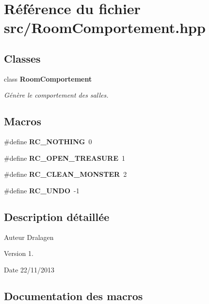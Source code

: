 \section{Référence du fichier src/\-Room\-Comportement.hpp}
\label{_room_comportement_8hpp}
\subsection*{Classes}
\begin{DoxyCompactItemize}
\item 
class {\bf Room\-Comportement}
\begin{DoxyCompactList}\small\item\em Génère le comportement des salles. \end{DoxyCompactList}\end{DoxyCompactItemize}
\subsection*{Macros}
\begin{DoxyCompactItemize}
\item 
\#define {\bf R\-C\-\_\-\-N\-O\-T\-H\-I\-N\-G}~0
\item 
\#define {\bf R\-C\-\_\-\-O\-P\-E\-N\-\_\-\-T\-R\-E\-A\-S\-U\-R\-E}~1
\item 
\#define {\bf R\-C\-\_\-\-C\-L\-E\-A\-N\-\_\-\-M\-O\-N\-S\-T\-E\-R}~2
\item 
\#define {\bf R\-C\-\_\-\-U\-N\-D\-O}~-\/1
\end{DoxyCompactItemize}


\subsection{Description détaillée}
\begin{DoxyAuthor}{Auteur}
Dralagen 
\end{DoxyAuthor}
\begin{DoxyVersion}{Version}
1. 
\end{DoxyVersion}
\begin{DoxyDate}{Date}
22/11/2013 
\end{DoxyDate}


\subsection{Documentation des macros}
